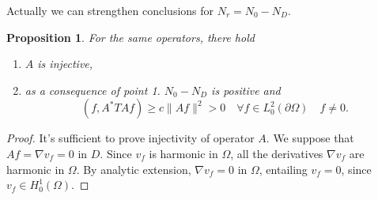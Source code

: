 \documentclass[10pt, a4paper, twoside, openright]{book}
\theoremstyle{definition}
\theoremstyle{plain}
\theoremstyle{plain}
\theoremstyle{plain}
\newtheorem{proposition}[subsection]{Proposition}
\theoremstyle{plain}
\theoremstyle{plain}
\theoremstyle{plain}
\theoremstyle{plain}
\theoremstyle{plain}
\begin{document}
Actually we can strengthen conclusions for ${N_r} = {N_0} - {N_D}$.
\begin{proposition}
For the same operators, there hold
\begin{enumerate}
 \item $A$ is injective,
 \item as a consequence of point 1. ${N_0} -{N_D}$ is positive and
  \begin{equation}
   (f,A^*TAf)\geq c\|Af\|^2 > 0\quad \forall f \in L^2_0(\partial \Omega)\quad f\neq 0.
  \end{equation}
\end{enumerate}
\end{proposition}
\begin{proof}
It's sufficient to prove injectivity of operator $A$. We suppose that $Af=\nabla v_f = 0$ in $D$.
Since $v_f$ is harmonic in $\Omega$, all the derivatives $\nabla v_f$ are harmonic in $\Omega$.
By analytic extension, $\nabla v_f = 0$ in $\Omega$, entailing $v_f=0$, since $v_f\in H^1_0(\Omega)$.
\end{proof}
\end{document}
